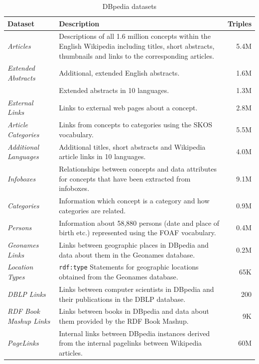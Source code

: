\documentclass{llncs}
\begin{document}
\begin{table}
	\centering
		\begin{tabular}{p{2.5cm}p{8cm}r}
			\textbf{Dataset} & \textbf{Description} & \textbf{Triples}\\
			\hline
\textit{Articles} & Descriptions of all 1.6 million concepts within the English Wikipedia including titles, short abstracts, thumbnails and links to the corresponding articles. & 5.4M \\
\textit{Extended Abstracts} & Additional, extended English abstracts. & 1.6M \\
 & Extended abstracts in 10 languages. & 1.3M \\
\textit{External Links} & Links to external web pages about a concept. & 2.8M \\
\textit{Article Categories} & Links from concepts to categories using the SKOS vocabulary. & 5.5M \\
\textit{Additional Languages} & Additional titles, short abstracts and Wikipedia article links in 10 languages. & 4.0M \\
\textit{Infoboxes} & Relationships between concepts and data attributes for concepts that have been extracted from infoboxes. & 9.1M \\
\textit{Categories} & Information which concept is a category and how categories are related. & 0.9M \\
\textit{Persons} & Information about 58,880 persons (date and place of birth etc.) represented using the FOAF vocabulary. & 0.4M\\
\textit{Geonames Links} & Links between geographic places in DBpedia and data about them in the Geonames database. & 0.2M \\
\textit{Location Types} & \verb|rdf:type| Statements for geographic locations obtained from the Geonames database. & 65K \\
\textit{DBLP Links} & Links between computer scientists in DBpedia and their publications in the DBLP database. & 200\\
\textit{RDF Book Mashup Links} & Links between books in DBpedia and data about them provided by the RDF Book Mashup. & 9K \\
\textit{PageLinks} & Internal links between DBpedia instances derived from the internal pagelinks between Wikipedia articles. & 60M \\
		\end{tabular}
	\caption{DBpedia datasets}
	\label{tab:DBpediaDatasets}
\end{table}
\end{document}

